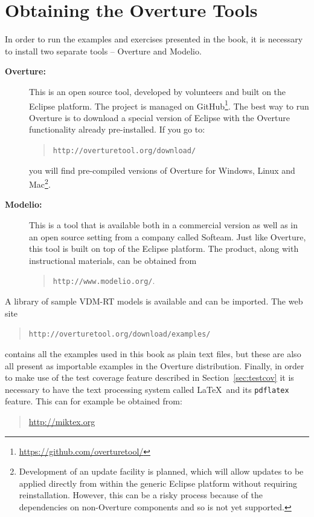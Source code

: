 \section{Obtaining the Overture Tools}\label{sec:install}

In order to run the examples and exercises presented in the book, it
is necessary to install two separate tools -- Overture and Modelio.
\begin{description}
\item[\textbf{Overture:}] This
 is an open source tool, developed by volunteers and built on
the Eclipse platform. The project is managed on
GitHub\footnote{\url{https://github.com/overturetool/}}.
The best way to run Overture is to download a special version of
Eclipse with the Overture functionality already pre-installed. If you
go to:
  \begin{quote}
  \texttt{http://overturetool.org/download/}
  \end{quote}
  \noindent you will find pre-compiled versions of Overture for
  Windows, Linux and Mac\footnote{Development of an update facility is planned, which will allow updates to be applied directly from within the generic Eclipse platform without requiring reinstallation. However, this
    can be a risky process because of the dependencies on non-Overture
    components and so is not yet supported.}.

\item[\textbf{Modelio:}] This is a tool that is available both in a commercial version as well as in an open source setting from a
  company called Softeam. Just like Overture, this tool is built on top of the Eclipse platform. The product, along with instructional materials, can be
  obtained from
\begin{quote}
\texttt{http://www.modelio.org/}.
\end{quote}
\end{description}

A library of sample VDM-RT models is available and can be imported.  The web site
%
\begin{quote}
\texttt{http://overturetool.org/download/examples/}
\end{quote}
%
contains all the examples used in this book
as plain text files, but these are also all present as importable examples in the Overture distribution. Finally, in order to make use of the
test coverage feature described in Section~\ref{sec:testcov} it is
necessary to have the text processing system called \LaTeX\ and its
\texttt{pdflatex} feature. This can for example be obtained from:
\begin{quote}
\url{http://miktex.org}
\end{quote}

